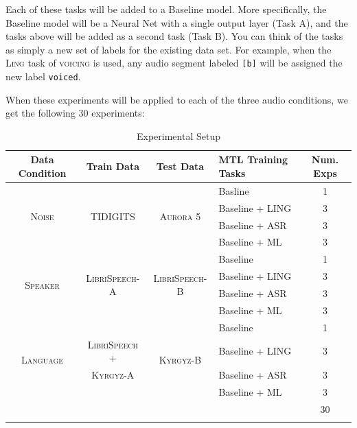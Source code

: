 \documentclass[10pt,a4paper]{article}
\begin{document}
Each of these tasks will be added to a Baseline model. More specifically, the Baseline model will be a Neural Net with a single output layer (Task A), and the tasks above will be added as a second task (Task B). You can think of the tasks as simply a new set of labels for the existing data set. For example, when the \textsc{Ling} task of \textsc{voicing} is used, any audio segment labeled \texttt{[b]} will be assigned the new label \texttt{voiced}.

When these experiments will be applied to each of the three audio conditions, we get the following 30 experiments:

\begin{table}[htbp]
  \centering
  \begin{adjustbox}{width=.95\textwidth}
    \begin{tabular}{ccclc}
      \toprule
      \textbf{Data Condition} & \textbf{Train Data} & \textbf{Test Data} & \textbf{MTL Training Tasks} & \textbf{Num. Exps} \\
      \midrule
      \multirow{4}{*}{\textsc{Noise}} & \multirow{4}{*}{\textsc{TIDIGITS}} & \multirow{4}{*}{\textsc{Aurora 5}} & Basline & 1\\
      & & & Baseline + LING & 3   \\
      & & & Baseline + ASR  & 3  \\
      & & & Baseline + ML   & 3  \\
      \midrule
      \multirow{4}{*}{\textsc{Speaker}} & \multirow{4}{*}{\textsc{LibriSpeech-A}} & \multirow{4}{*}{\textsc{LibriSpeech-B}} & Baseline & 1 \\
      & & & Baseline + LING & 3  \\
      & & & Baseline + ASR  & 3  \\
      & & & Baseline + ML   & 3  \\     \midrule
      \multirow{4}{*}{\textsc{Language}} & & \multirow{4}{*}{\textsc{Kyrgyz-B}} & Baseline & 1\\
      & \textsc{LibriSpeech +} & & Baseline + LING  & 3 \\
      &  \textsc{Kyrgyz-A} & & Baseline + ASR   & 3 \\
      & & & Baseline + ML & 3 \\
      \midrule
      &&&& 30\\
      \bottomrule\\
    \end{tabular}
    \label{table:data}
  \end{adjustbox}
  
  \caption{Experimental Setup}
  
\end{table}
\end{document}
